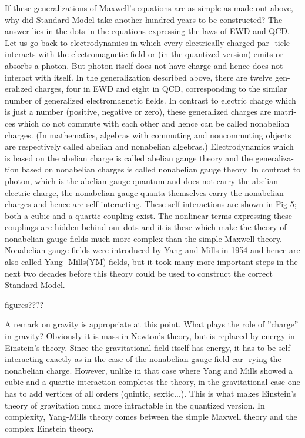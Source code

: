 If these generalizations of Maxwell’s equations are as simple as made out
above, why did Standard Model take another hundred years to be constructed?
The answer lies in the dots in the equations expressing the laws of EWD and
QCD. Let us go back to electrodynamics in which every electrically charged par-
ticle interacts with the electromagnetic field or (in the quantized version) emits
or absorbs a photon. But photon itself does not have charge and hence does not
interact with itself. In the generalization described above, there are twelve gen-
eralized charges, four in EWD and eight in QCD, corresponding to the similar
number of generalized electromagnetic fields. In contrast to electric charge which
is just a number (positive, negative or zero), these generalized charges are matri-
ces which do not commute with each other and hence can be called nonabelian
charges. (In mathematics, algebras with commuting and noncommuting objects
are respectively called abelian and nonabelian algebras.) Electrodynamics which
is based on the abelian charge is called abelian gauge theory and the generaliza-
tion based on nonabelian charges is called nonabelian gauge theory. In contrast to
photon, which is the abelian gauge quantum and does not carry the abelian electric
charge, the nonabelian gauge quanta themselves carry the nonabelian charges and
hence are self-interacting. These self-interactions are shown in Fig 5; both a cubic
and a quartic coupling exist. The nonlinear terms expressing these couplings are
hidden behind our dots and it is these which make the theory of nonabelian gauge
fields much more complex than the simple Maxwell theory. Nonabelian gauge
fields were introduced by Yang and Mills in 1954 and hence are also called Yang-
Mills(YM) fields, but it took many more important steps in the next two decades
before this theory could be used to construct the correct Standard Model.

figures????

A remark on gravity is appropriate at this point. What plays the role of
”charge” in gravity? Obviously it is mass in Newton’s theory, but is replaced
by energy in Einstein’s theory. Since the gravitational field itself has energy, it
has to be self-interacting exactly as in the case of the nonabelian gauge field car-
rying the nonabelian charge. However, unlike in that case where Yang and Mills
showed a cubic and a quartic interaction completes the theory, in the gravitational
case one has to add vertices of all orders (quintic, sextic...). This is what makes
Einstein’s theory of gravitation much more intractable in the quantized version.
In complexity, Yang-Mills theory comes between the simple Maxwell theory and
the complex Einstein theory.

